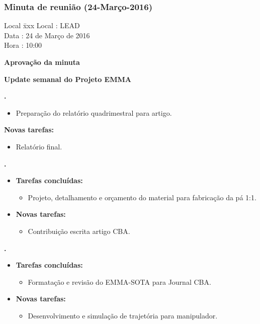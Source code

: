 \subsubsection{Minuta de reunião (24-Março-2016)}

\begin{tabbing}
  Local \= xxx \kill
  Local \> : LEAD \\
  Data  \> : 24 de Março de 2016 \\
  Hora  \> : 10:00
\end{tabbing} 


\textbf{Aprovação da minuta}

\textbf{Update semanal do Projeto EMMA}

						
\textbf{\gabriel.} 
	\begin{itemize}
			\item Preparação do relatório quadrimestral para artigo.
			\end{itemize}
		
		\item \textbf{Novas tarefas:}
			\begin{itemize} 
			\item Relatório final.
			\end{itemize}

					
   \textbf{.} 
	\begin{itemize}
		\item \textbf{Tarefas concluídas:}
			\begin{itemize}    
 				\item Projeto, detalhamento e orçamento do material para fabricação da pá
			    1:1.				
			\end{itemize}
		
		\item \textbf{Novas tarefas:}
			\begin{itemize} 
			    \item Contribuição escrita artigo CBA.
			\end{itemize}
	\end{itemize}

	
	  \textbf{\renan.} 
	\begin{itemize}
		\item \textbf{Tarefas concluídas:}
			\begin{itemize}    
			\item Formatação e revisão do EMMA-SOTA para Journal CBA.
			\end{itemize}
		
		\item \textbf{Novas tarefas:}
			\begin{itemize} 
				\item Desenvolvimento e simulação de trajetória para manipulador.
			\end{itemize}
	\end{itemize}			
			
